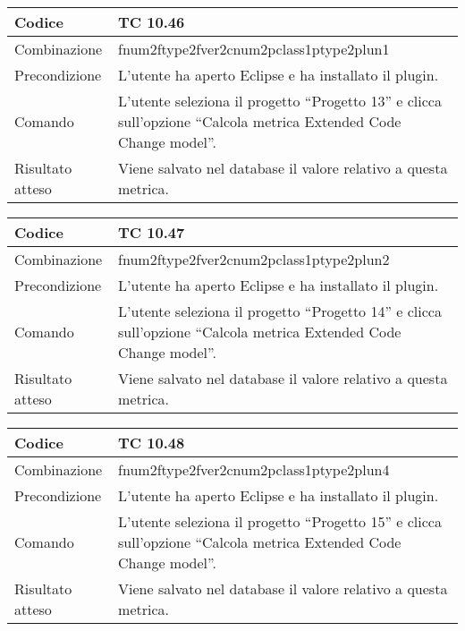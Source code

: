 \begin{table}[ht]
\begin{tabular}{|p{3cm}|p{9cm}|}
\hline
\cellcolor{lightgray}Codice				& TC 10.46								\\
\hline
\cellcolor{lightgray}Combinazione		& fnum2ftype2fver2cnum2pclass1ptype2plun1									\\
\hline
\cellcolor{lightgray}Precondizione		& L'utente ha aperto Eclipse e ha installato il plugin.		\\
\hline
\cellcolor{lightgray}Comando			& L'utente seleziona il progetto ``Progetto 13''  e clicca sull'opzione ``Calcola metrica Extended Code Change model''.	\\
\hline
\cellcolor{lightgray}Risultato atteso	& Viene salvato nel database il valore relativo a questa metrica.\\
\hline
\end{tabular}
\end{table}

\begin{table}[ht]
\begin{tabular}{|p{3cm}|p{9cm}|}
\hline
\cellcolor{lightgray}Codice				& TC 10.47								\\
\hline
\cellcolor{lightgray}Combinazione		& fnum2ftype2fver2cnum2pclass1ptype2plun2									\\
\hline
\cellcolor{lightgray}Precondizione		& L'utente ha aperto Eclipse e ha installato il plugin.		\\
\hline
\cellcolor{lightgray}Comando			& L'utente seleziona il progetto ``Progetto 14''  e clicca sull'opzione ``Calcola metrica Extended Code Change model''.	\\
\hline
\cellcolor{lightgray}Risultato atteso	& Viene salvato nel database il valore relativo a questa metrica.\\
\hline
\end{tabular}
\end{table}

\begin{table}[ht]
\begin{tabular}{|p{3cm}|p{9cm}|}
\hline
\cellcolor{lightgray}Codice				& TC 10.48								\\
\hline
\cellcolor{lightgray}Combinazione		& fnum2ftype2fver2cnum2pclass1ptype2plun4									\\
\hline
\cellcolor{lightgray}Precondizione		& L'utente ha aperto Eclipse e ha installato il plugin.		\\
\hline
\cellcolor{lightgray}Comando			& L'utente seleziona il progetto ``Progetto 15''  e clicca sull'opzione ``Calcola metrica Extended Code Change model''.	\\
\hline
\cellcolor{lightgray}Risultato atteso	& Viene salvato nel database il valore relativo a questa metrica.\\
\hline
\end{tabular}
\end{table}

